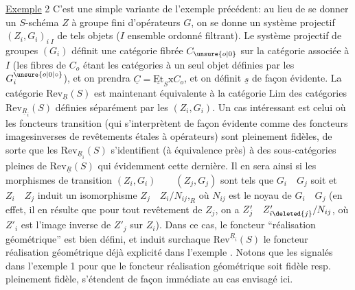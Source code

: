 \uline{Exemple} 2 C'est une simple variante de l'exemple précédent: au lieu de se donner un $S$-schéma $Z$ à groupe fini d'opérateurs $G$, on se donne un système projectif $(Z_i,G_i)_{i\;I}$ de tels objets ($I$ ensemble ordonné filtrant).  Le système projectif de groupes $(G_i)$ définit une catégorie fibrée $C_{\unsure{o|0}}$ sur la catégorie associée à $I$ (les fibres de $C_o$ étant les catégories à un seul objet définies par les $G_i^{\unsure{o|0|\circ}}$), et on prendra $\underline{C}=\underline{\mathrm{Et}}_S\mathrm{x}C_o$, et on définit $\underline{s}$ de façon évidente. La catégorie $\mathrm{Rev}_{\underline{R}}(S)$ est maintenant équivalente à la catégorie $\mathrm{Lim}$ des catégories $\mathrm{Rev}_{\underline{R}_i}(S)$ définies séparément par les $(Z_i,G_i)$. Un cas intéressant est celui où les foncteurs transition (qui s'interprètent de façon évidente comme des foncteurs imagesinverses de revêtements étales à opérateurs) sont pleinement fidèles, de sorte que les $\mathrm{Rev}_{\underline{R}_i}(S)$ s'identifient (à équivalence près) à des sous-catégories pleines de $\mathrm{Rev}_{\underline{R}}(S)$ qui  évidemment cette dernière. Il en sera ainsi si les morphismes de transition $(Z_i,G_i)\qquad(Z_j,G_j)$ sont tels que $G_i\quad G_j$ soit  et $Z_i\quad Z_j$ induit un isomorphisme $Z_j\quad Z_i/N_{ij}\mathord{,}_{R}$ où $N_{ij}$ est le noyau de $G_i\quad G_j$ (en effet, il en résulte que pour tout revêtement 
de $Z_j$, on a $Z'_j\quad Z'_{i\deleted{j}}/N_{ij}$, où $Z'_i$ est l'image inverse de $Z'_j$ sur $Z_i$). Dans ce cas, le foncteur ``réalisation géométrique'' est bien défini, et induit surchaque $\mathrm{Rev}^{\underline{R}_i}(S)$ le foncteur réalisation géométrique déjà explicité dans l'exemple .  Notons que les  signalés dans l'exemple 1 pour que le foncteur réalisation géométrique soit fidèle resp. pleinement fidèle, s'étendent de façon immédiate au cas envisagé ici.

